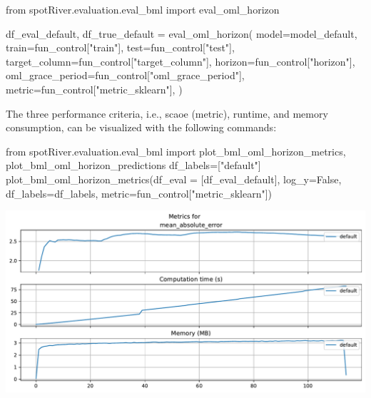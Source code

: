 \documentclass[
  letterpaper,
  DIV=11,
  numbers=noendperiod]{scrreprt}
\newenvironment{Shaded}{\begin{snugshade}}{\end{snugshade}}
\newcommand{\ImportTok}[1]{\textcolor[rgb]{0.00,0.46,0.62}{#1}}
\newcommand{\NormalTok}[1]{\textcolor[rgb]{0.00,0.23,0.31}{#1}}
\newcommand{\OperatorTok}[1]{\textcolor[rgb]{0.37,0.37,0.37}{#1}}
\newcommand{\StringTok}[1]{\textcolor[rgb]{0.13,0.47,0.30}{#1}}
\newcommand{\VariableTok}[1]{\textcolor[rgb]{0.07,0.07,0.07}{#1}}
\begin{document}
\begin{Shaded}
\begin{Highlighting}[]
\ImportTok{from}\NormalTok{ spotRiver.evaluation.eval\_bml }\ImportTok{import}\NormalTok{ eval\_oml\_horizon}

\NormalTok{df\_eval\_default, df\_true\_default }\OperatorTok{=}\NormalTok{ eval\_oml\_horizon(}
\NormalTok{                    model}\OperatorTok{=}\NormalTok{model\_default,}
\NormalTok{                    train}\OperatorTok{=}\NormalTok{fun\_control[}\StringTok{"train"}\NormalTok{],}
\NormalTok{                    test}\OperatorTok{=}\NormalTok{fun\_control[}\StringTok{"test"}\NormalTok{],}
\NormalTok{                    target\_column}\OperatorTok{=}\NormalTok{fun\_control[}\StringTok{"target\_column"}\NormalTok{],}
\NormalTok{                    horizon}\OperatorTok{=}\NormalTok{fun\_control[}\StringTok{"horizon"}\NormalTok{],}
\NormalTok{                    oml\_grace\_period}\OperatorTok{=}\NormalTok{fun\_control[}\StringTok{"oml\_grace\_period"}\NormalTok{],}
\NormalTok{                    metric}\OperatorTok{=}\NormalTok{fun\_control[}\StringTok{"metric\_sklearn"}\NormalTok{],}
\NormalTok{                )}
\end{Highlighting}
\end{Shaded}

The three performance criteria, i.e., scaoe (metric), runtime, and
memory consumption, can be visualized with the following commands:

\begin{Shaded}
\begin{Highlighting}[]
\ImportTok{from}\NormalTok{ spotRiver.evaluation.eval\_bml }\ImportTok{import}\NormalTok{ plot\_bml\_oml\_horizon\_metrics, plot\_bml\_oml\_horizon\_predictions}
\NormalTok{df\_labels}\OperatorTok{=}\NormalTok{[}\StringTok{"default"}\NormalTok{]}
\NormalTok{plot\_bml\_oml\_horizon\_metrics(df\_eval }\OperatorTok{=}\NormalTok{ [df\_eval\_default], log\_y}\OperatorTok{=}\VariableTok{False}\NormalTok{, df\_labels}\OperatorTok{=}\NormalTok{df\_labels, metric}\OperatorTok{=}\NormalTok{fun\_control[}\StringTok{"metric\_sklearn"}\NormalTok{])}
\end{Highlighting}
\end{Shaded}

\includegraphics{025_spot_hpt_river_friedman_amfr_files/figure-pdf/cell-28-output-1.pdf}
\end{document}

